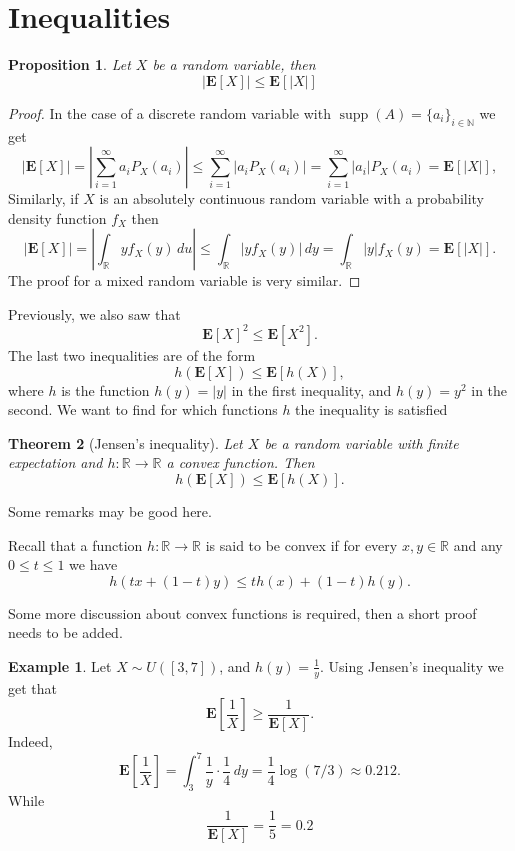 \documentclass[11pt,a4paper]{article}
\theoremstyle{definition}
\newtheorem{example}{Example}[section]
\theoremstyle{plain}
\newtheorem{theorem}{Theorem}[section]
\newtheorem{proposition}[theorem]{Proposition}
\DeclareMathOperator{\supp}{supp}
\newcommand{\N}{\mathbb{N}}
\newcommand{\R}{\mathbb{R}}
\newcommand{\abs}[1]{\left\lvert #1\right\rvert}
\begin{document}
  \section{Inequalities}
  \begin{proposition}
    Let $X$ be a random variable, then
    \[
      \abs{\mathbf E[X]} \le \mathbf E[\abs{X}]
    \]
  \end{proposition}
  \begin{proof}
  In the case of a discrete random variable with 
  $\supp(A) = \{a_i\}_{i \in \N}$ we get
    \[
      |\mathbf{E}[X]|=
      \abs{\sum_{i=1}^{\infty} a_{i} P_{X}(a_{i})} \leq
      \sum_{i=1}^{\infty} \abs{a_{i} P_{X}(a_{i})} =
      \sum_{i=1}^{\infty} \abs{a_{i}} P_{X}(a_{i}) =
      \mathbf{E}[|X|],
    \]
    Similarly, if $X$ is an absolutely continuous random variable with
    a probability density function $f_X$ then
    \[
      \abs{\mathbf{E}[X]} =
      \abs{\int_{\R}y f_{X}(y)\,du} \leq
      \int_{\R} \abs{y f_{X}(y)}\,dy =
      \int_{\R} \abs{y} f_{X}(y) =
      \mathbf{E}[\abs{X}].
    \]
    The proof for a mixed random variable is very similar.
  \end{proof}

  Previously, we also saw that
  \[
    \mathbf{E}[X]^{2} \leq \mathbf{E}[X^{2}].
  \]
  The last two inequalities are of the form
  \[
    h(\mathbf{E}[X])\leq\mathbf{E}[h(X)],
  \]
  where $h$ is the function $h(y) = \abs{y}$ in the first inequality, and
  $h(y) = y^2$ in the second.
  We want to find for which functions $h$ the inequality is satisfied

  \begin{theorem}[Jensen's inequality]
    Let $X$ be a random variable with finite expectation and 
    $h \colon \R \to \R$ a convex function. Then
    \[
      h(\mathbf{E}[X])\leq\mathbf{E}[h(X)].
    \]
  \end{theorem}

  Some remarks may be good here.

  Recall that a function $h \colon \R \to \R$ is said to be convex if for
  every $x,y \in \R$ and any $0 \le t \le 1$ we have
  \[
    h(t x+(1-t)y)\leq t h(x)+(1-t)h(y).
  \]

  Some more discussion about convex functions is required, then a short
  proof needs to be added.

  \begin{example}
    Let $X \sim U([3,7])$, and $h(y) = \frac{1}{y}$. Using Jensen's inequality
    we get that
    \[
      \mathbf{E}\left[{\frac{1}{X}}\right]\geq{\frac{1}{\mathbf{E}[X]}}.
    \]
    Indeed,
    \[
      \mathbf{E} \left[{\frac{1}{X}}\right] =
      \int_{3}^{7}{\frac{1}{y}}\cdot{\frac{1}{4}}\,dy =
      \frac{1}{4} \log(7/3) \approx
      0.212.
    \]
    While
    \[
      \frac{1}{\mathbf E[X]} = \frac{1}{5} = 0.2
    \]
  \end{example}
  
\end{document}
